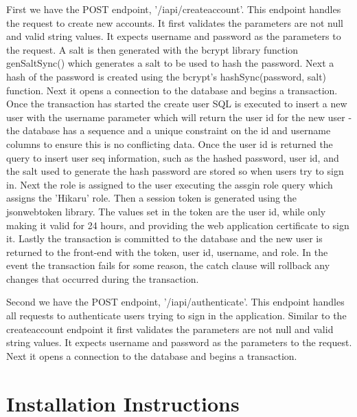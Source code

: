 \documentclass[12pt]{article}
\begin{document}
First we have the POST endpoint, '/iapi/createaccount'. This endpoint handles the request to create new accounts. It first validates the parameters are not null and valid string values. It expects username and password as the parameters to the request. A salt is then generated with the bcrypt library function genSaltSync() which generates a salt to be used to hash the password. Next a hash of the password is created using the bcrypt's hashSync(password, salt) function. Next it opens a connection to the database and begins a transaction. Once the transaction has started the create user SQL is executed to insert a new user with the username parameter which will return the user id for the new user - the database has a sequence and a unique constraint on the id and username columns to ensure this is no conflicting data. Once the user id is returned the query to insert user seq information, such as the hashed password, user id, and the salt used to generate the hash password are stored so when users try to sign in. Next the role is assigned to the user executing the assgin role query which assigns the 'Hikaru' role. Then a session token is generated using the jsonwebtoken library. The values set in the token are the user id, while only making it valid for 24 hours, and providing the web application certificate to sign it. Lastly the transaction is committed to the database and the new user is returned to the front-end with the token, user id, username, and role. In the event the transaction fails for some reason, the catch clause will rollback any changes that occurred during the transaction.

Second we have the POST endpoint, '/iapi/authenticate'. This endpoint handles all requests to authenticate users trying to sign in the application. Similar to the createaccount endpoint it first validates the parameters are not null and valid string values. It expects username and password as the parameters to the request. Next it opens a connection to the database and begins a transaction. 
\subsubsection{}

\maketitle
\section{Installation Instructions}
\end{document}
